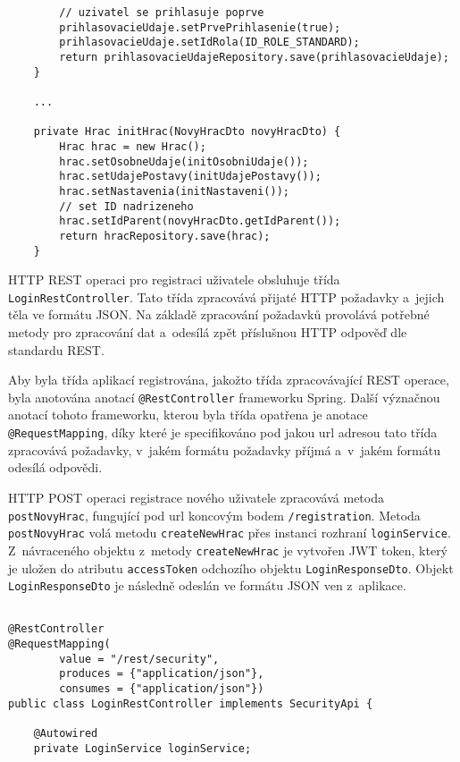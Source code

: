 \documentclass[12pt]{article}
\begin{document}
{\begin{lstlisting}
        // uzivatel se prihlasuje poprve
        prihlasovacieUdaje.setPrvePrihlasenie(true);
        prihlasovacieUdaje.setIdRola(ID_ROLE_STANDARD);
        return prihlasovacieUdajeRepository.save(prihlasovacieUdaje);
    }

    ...

    private Hrac initHrac(NovyHracDto novyHracDto) {
        Hrac hrac = new Hrac();
        hrac.setOsobneUdaje(initOsobniUdaje());
        hrac.setUdajePostavy(initUdajePostavy());
        hrac.setNastavenia(initNastaveni());
        // set ID nadrizeneho
        hrac.setIdParent(novyHracDto.getIdParent());
        return hracRepository.save(hrac);
    }
\end{lstlisting}

\clearpage

HTTP REST operaci pro registraci uživatele obsluhuje třída \texttt{LoginRestController}. 
Tato třída zpracovává přijaté HTTP požadavky a~jejich těla ve formátu JSON. Na základě zpracování požadavků provolává potřebné metody pro zpracování dat a~odesílá zpět příslušnou HTTP odpověď dle standardu REST.

Aby byla třída aplikací registrována, jakožto třída zpracovávající REST operace, byla anotována anotací \texttt{@RestController} frameworku Spring. Další význačnou anotací tohoto frameworku, kterou byla třída opatřena je anotace\texttt{ @RequestMapping}, díky které je specifikováno pod jakou url adresou tato třída zpracovává požadavky, v~jakém formátu požadavky příjmá a~v~jakém formátu odesílá odpovědi. 

HTTP POST operaci registrace nového uživatele zpracovává metoda \texttt{postNovyHrac}, fungující pod url koncovým bodem \texttt{/registration}. 
Metoda \texttt{postNovyHrac} volá metodu \texttt{createNewHrac} přes instanci rozhraní \texttt{loginService}. Z~návraceného objektu z~metody \texttt{createNewHrac} je vytvořen JWT token, který je uložen do atributu \texttt{accessToken} odchozího objektu \texttt{LoginResponseDto}. Objekt \texttt{LoginResponseDto} je následně odeslán ve formátu JSON ven z~aplikace.

\clearpage

\begin{lstlisting}

@RestController
@RequestMapping(
        value = "/rest/security",
        produces = {"application/json"},
        consumes = {"application/json"})
public class LoginRestController implements SecurityApi {
    
    @Autowired
    private LoginService loginService;
    

\end{lstlisting}}
\end{document}
